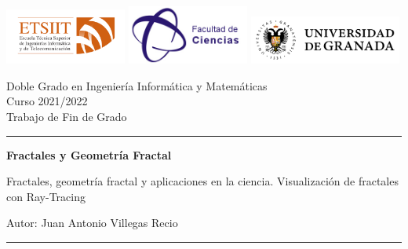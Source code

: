 \documentclass[11pt]{report}
\begin{document}
\renewcommand{\figurename}{Imagen}
\renewcommand{\listfigurename}{Lista de Imágenes}


\thispagestyle{empty}
\begin{titlepage}
    \hspace{-1.5cm}
	\includegraphics[width=40mm]{img/LogoETSIIT.png}
	\includegraphics[width=40mm]{img/LogoFacultadCiencias.jpeg}
	\hfill
	\includegraphics[width=50mm]{img/LogoUGR.png}
	
	\noindent\begin{small} \sffamily
		\begin{minipage}{0.65\textwidth}
			Doble Grado en Ingeniería Informática y Matemáticas\\
			Curso 2021/2022\\
			Trabajo de Fin de Grado\\
		\end{minipage}
	\hrule
	\end{small}

	\vspace{1cm}
	{\LARGE\noindent \textbf{Fractales y Geometría Fractal} \par}
	\vspace{0.5cm}
	{\Large\noindent Fractales, geometría fractal y aplicaciones en la ciencia. Visualización de fractales con Ray-Tracing \par}
	\vspace{2cm}
	{\LARGE\noindent Autor: Juan Antonio Villegas Recio \par} 
	
	\vfill
		
	\hrule
	\vspace{0.3cm}
	

\end{titlepage}
\end{document}

